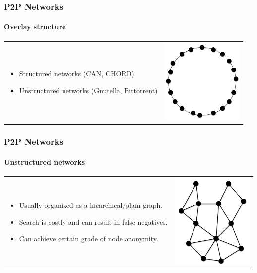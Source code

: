 \documentclass[12pt]{beamer}
\begin{document}
  \begin{frame}
  \frametitle{P2P Networks}
  \framesubtitle{Overlay structure}
  \begin{table}
  \begin{tabular}{p{7cm}p{3cm}}
  \begin{itemize}
      \item Structured networks (CAN, CHORD)
      \item Unstructured networks (Gnutella, Bittorrent)
  \end{itemize}
  &
  \vspace{1.5cm}
  \includegraphics[width=4cm]{../../presentacion/img/p2p-structured}\\
  \end{tabular}
  \end{table}
  \end{frame}

  \begin{frame}
  \frametitle{P2P Networks}
  \framesubtitle{Unstructured networks}
  \begin{table}
  \begin{tabular}{p{7cm}p{3cm}}
  \begin{itemize}
      \item Usually organized as a hiearchical/plain graph.
      \item Search is costly and can result in false negatives.
      \item Can achieve certain grade of node anonymity. 
  \end{itemize}
  &
  \vspace{1.5cm}
  \includegraphics[width=4cm]{../../presentacion/img/p2p-unstructured}\\
  \end{tabular}
  \end{table}
  \end{frame}
\end{document}
